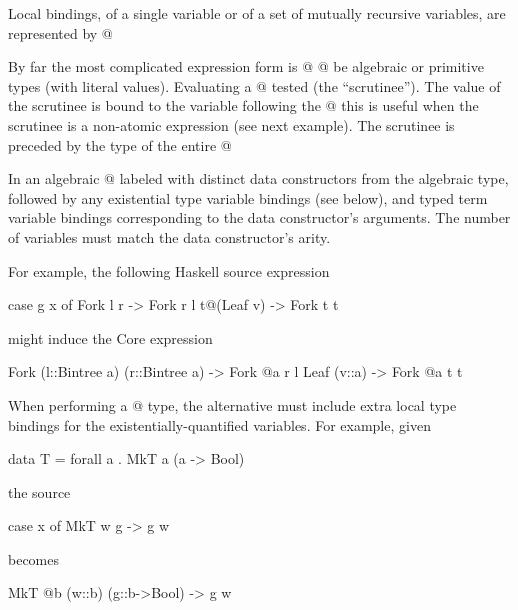 \documentclass[10pt]{article}
\begin{document}
Local bindings, of a single variable or of a set of mutually recursive variables,
are represented by @%

By far the most complicated expression form is @%
@%
be algebraic or primitive types (with literal values).
Evaluating a @%
tested (the ``scrutinee''). The value of the scrutinee is bound to the variable
following the @%
this is useful when the scrutinee is a non-atomic
expression (see next example). The scrutinee is preceded by the type of the entire @%

In an algebraic @%
labeled with distinct data constructors from the algebraic type, followed by
any existential type variable bindings (see below), and 
typed term variable bindings corresponding to the data constructor's
arguments. The number of variables must match the data constructor's arity.

For example, the following Haskell source expression
\begin{code}
case g x of
  Fork l r -> Fork r l
  t@(Leaf v) -> Fork t t
\end{code}
might induce the Core expression
\begin{code}
   Fork (l::Bintree a) (r::Bintree a) ->
      Fork @a r l
   Leaf (v::a) ->
      Fork @a t t
\end{code}

When performing a @%
type, the alternative must include extra local type bindings 
for the existentially-quantified variables.  For example, given 
\begin{code}
data T = forall a . MkT a (a -> Bool)
\end{code}
the source
\begin{code}
case x of
  MkT w g -> g w
\end{code}
becomes
\begin{code}
  MkT @b (w::b) (g::b->Bool) -> g w
\end{code}
\end{document}
